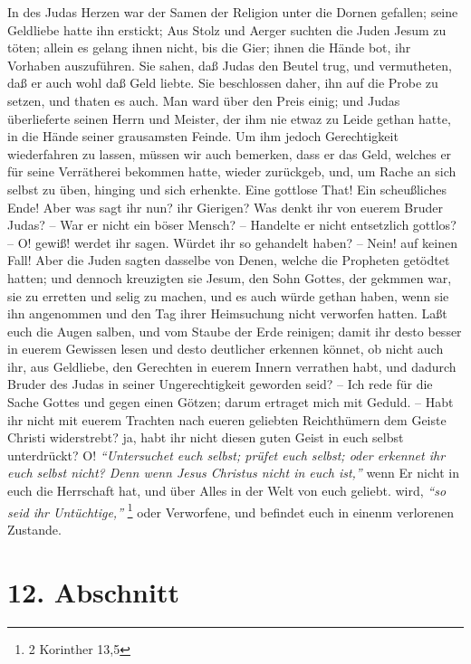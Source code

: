 In des Judas Herzen war der Samen der Religion unter die Dornen gefallen; seine
Geldliebe hatte ihn erstickt; Aus Stolz und Aerger suchten die Juden Jesum zu
töten; allein es gelang ihnen nicht, bis die Gier; ihnen die Hände bot, ihr
Vorhaben auszuführen. Sie sahen, daß Judas den Beutel trug, und vermutheten, daß
er auch wohl daß Geld liebte. Sie beschlossen daher, ihn auf die Probe zu
setzen, und thaten es auch. Man ward über den Preis einig; und Judas
überlieferte seinen Herrn und Meister, der ihm nie etwaz zu Leide gethan hatte,
in die Hände seiner grausamsten Feinde. Um ihm jedoch Gerechtigkeit wiederfahren
zu lassen, müssen wir auch bemerken, dass er das Geld, welches er für seine
Verrätherei bekommen hatte, wieder zurückgeb, und, um Rache an sich selbst zu
üben, hinging und sich erhenkte. Eine gottlose That! Ein scheußliches Ende! Aber
was sagt ihr nun? ihr Gierigen? Was denkt ihr von euerem Bruder Judas? -- War er
nicht ein böser Mensch? -- Handelte er nicht entsetzlich gottlos? -- O! gewiß!
werdet ihr sagen. Würdet ihr so gehandelt haben? -- Nein! auf keinen Fall! Aber
die Juden sagten dasselbe von Denen, welche die Propheten getödtet hatten; und
dennoch kreuzigten sie Jesum, den Sohn Gottes, der gekmmen war, sie zu erretten
und selig zu machen, und es auch würde gethan haben, wenn sie ihn angenommen und
den Tag ihrer Heimsuchung nicht verworfen hatten. Laßt euch die Augen salben,
und vom Staube der Erde reinigen; damit ihr desto besser in euerem Gewissen
lesen und desto deutlicher erkennen könnet, ob nicht auch ihr, aus Geldliebe,
den Gerechten in euerem Innern verrathen habt, und dadurch Bruder des Judas in
seiner Ungerechtigkeit geworden seid? -- Ich rede für die Sache Gottes und gegen
einen Götzen; darum ertraget mich mit Geduld. -- Habt ihr nicht mit euerem
Trachten nach eueren geliebten Reichthümern dem Geiste Christi widerstrebt? ja,
habt ihr nicht diesen guten Geist in euch selbst unterdrückt? O! \textit{"`Untersuchet
euch selbst; prüfet euch selbst; oder erkennet ihr euch selbst nicht? Denn wenn
Jesus Christus nicht in euch ist,"'}
wenn Er nicht in euch die Herrschaft hat,
und über Alles in der Welt von euch geliebt. wird, \textit{"`so seid ihr
Untüchtige,"'}
\footnote{2 Korinther 13,5}
oder Verworfene, und befindet euch in einenm
verlorenen Zustande.

\section{12. Abschnitt} \label{kap13_ab12} 

